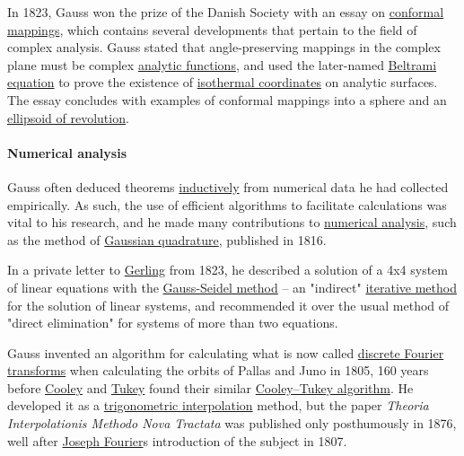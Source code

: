 In 1823, Gauss won the prize of the Danish Society with an essay on \href{https://en.wikipedia.org/wiki/Conformal_mapping}{conformal mappings}, which contains several developments that pertain to the field of complex analysis. Gauss stated that angle-preserving mappings in the complex plane must be complex \href{https://en.wikipedia.org/wiki/Analytic_function}{analytic functions}, and used the later-named \href{https://en.wikipedia.org/wiki/Beltrami_equation}{Beltrami equation} to prove the existence of \href{https://en.wikipedia.org/wiki/Isothermal_coordinates}{isothermal coordinates} on analytic surfaces. The essay concludes with examples of conformal mappings into a sphere and an \href{https://en.wikipedia.org/wiki/Ellipsoid_of_revolution}{ellipsoid of revolution}.


\paragraph{Numerical analysis}\label{Numerical_analysis}

Gauss often deduced theorems \href{https://en.wikipedia.org/wiki/Inductive_reasoning}{inductively} from numerical data he had collected empirically. As such, the use of efficient algorithms to facilitate calculations was vital to his research, and he made many contributions to \href{https://en.wikipedia.org/wiki/Numerical_analysis}{numerical analysis}, such as the method of \href{https://en.wikipedia.org/wiki/Gaussian_quadrature}{Gaussian quadrature}, published in 1816.

In a private letter to \href{https://en.wikipedia.org/wiki/Christian_Ludwig_Gerling}{Gerling} from 1823, he described a solution of a 4x4 system of linear equations with the \href{https://en.wikipedia.org/wiki/Gauss-Seidel_method}{Gauss-Seidel method} -- an "indirect" \href{https://en.wikipedia.org/wiki/Iterative_method}{iterative method} for the solution of linear systems, and recommended it over the usual method of "direct elimination" for systems of more than two equations.

Gauss invented an algorithm for calculating what is now called \href{https://en.wikipedia.org/wiki/Discrete_Fourier_transform}{discrete Fourier transforms} when calculating the orbits of Pallas and Juno in 1805, 160 years before \href{https://en.wikipedia.org/wiki/James_Cooley}{Cooley} and \href{https://en.wikipedia.org/wiki/John_Tukey}{Tukey} found their similar \href{https://en.wikipedia.org/wiki/Cooley-Tukey_FFT_algorithm}{Cooley--Tukey algorithm}. He developed it as a \href{https://en.wikipedia.org/wiki/Trigonometric_interpolation}{trigonometric interpolation} method, but the paper \emph{Theoria Interpolationis Methodo Nova Tractata} was published only posthumously in 1876, well after \href{https://en.wikipedia.org/wiki/Joseph_Fourier}{Joseph Fourier}\textquotesingle s introduction of the subject in 1807.


